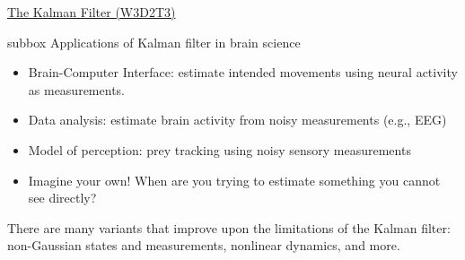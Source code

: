 \begin{textbox}{\href{http://instructor.compneuro.neuromatch.io/tutorials/W3D2_HiddenDynamics/instructor/W3D2_Tutorial3.html}{The Kalman Filter (W3D2T3)}   }
\begin{subbox}{subbox}{ Applications of Kalman filter in brain science}
\begin{itemize}
    \item  Brain-Computer Interface: estimate intended movements using neural activity as measurements.
\item Data analysis: estimate brain activity from noisy measurements (e.g., EEG)
\item Model of perception: prey tracking using noisy sensory measurements
\item Imagine your own! When are you trying to estimate something you cannot see directly?
\end{itemize}
There are many variants that improve upon the limitations of the Kalman filter: non-Gaussian states and measurements, nonlinear dynamics, and more.

\end{subbox}
\end{textbox}
